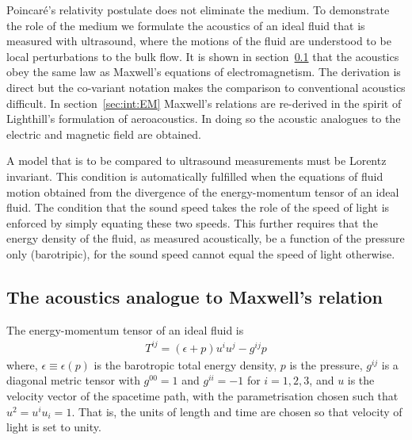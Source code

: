 \documentclass[10pt, fleqn,final,showtrims,oldfontcommands, article,a4paper,oneside]{memoir} %
\newcommand{\eqal}[2]{\begin{align}#1\label{eqn:#2}\end{align}}
\newcommand{\secref}[1]{section~\ref{sec:#1}}
\newcommand{\Poincare}{Poincar{\'e}\xspace}
\begin{document}
\Poincare's relativity postulate does not eliminate the medium.
To demonstrate the role of the medium we formulate the acoustics of  an ideal fluid that is measured with ultrasound,
where the motions of the fluid are  understood to be local perturbations to the bulk flow.
It is shown in \secref{MaxwellAnalogue} that the acoustics  obey the same law as Maxwell's equations of electromagnetism.
The derivation is direct but the co-variant notation makes the comparison to conventional acoustics difficult.
In \secref{int:EM} Maxwell's relations are re-derived in the spirit of Lighthill's formulation of aeroacoustics.
In doing so the acoustic analogues to the electric and magnetic field are obtained.

%
A model that is to be compared to ultrasound measurements must be  Lorentz invariant.
This condition is  automatically fulfilled  when the equations of fluid motion obtained from the  divergence of the energy-momentum tensor of an ideal fluid.
The condition that the sound speed takes the role  of the speed of light
is enforced by simply equating these two speeds.
This further requires that the energy density of the fluid, as measured acoustically, be a function of the pressure only (barotripic),
for the sound speed cannot equal the speed of light otherwise\cite{Taub1978}.

\subsection{The acoustics analogue to Maxwell's relation}\label{sec:MaxwellAnalogue}


The energy-momentum tensor of an ideal fluid is\cite{LandauBook, Taub1978}
\eqal{
  T^{i j} = (\epsilon + p) u^i u^j - g^{i j} p
}{EMtensor}
where, $\epsilon \equiv \epsilon(p)$ is the barotropic total energy density,
$p$ is the pressure,
$g^{i j}$ is a diagonal metric tensor with $g^{00}=1$ and $g^{i i} = -1$ for $i=1,2,3$,
and 
$u$ is the velocity vector of the spacetime path, with the parametrisation chosen such that $u^2 = u^i u_i = 1$. %
That is, the units of length and time are chosen so that velocity of light is set to unity.
\end{document}
